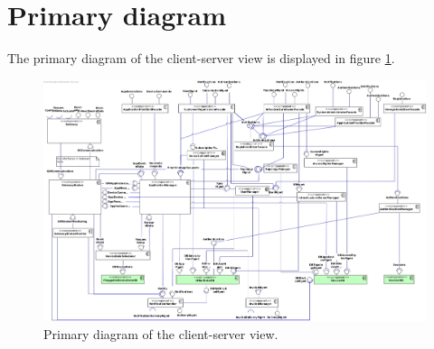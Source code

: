 \section{Primary diagram}
    The primary diagram of the client-server view is displayed in figure \ref{fig:cc-primary}. \\


    \begin{landscape}
        \centering
        \vspace*{\fill}

        \begin{figure}[!htp]
            \centering
            \includegraphics[width=\linewidth]{images/component-PRIMARY}
            \caption{Primary diagram of the client-server view.}\label{fig:cc-primary}
        \end{figure}

        \vfill
    \end{landscape}
